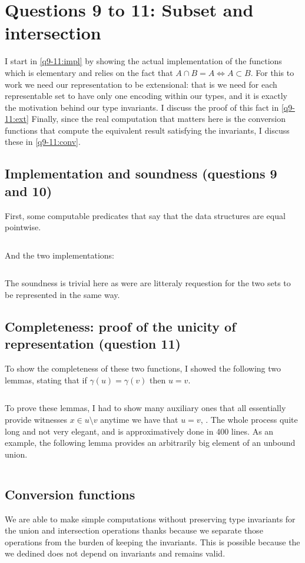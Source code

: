 \section{Questions 9 to 11: Subset and intersection}

I start in \autoref{q9-11:impl} by showing the actual implementation of the functions
which is elementary and relies on the fact that $A\cap B=A \iff A \subset B$.
%
For this to work we need our representation to be extensional: that is we need for
each representable set to have only one encoding within our types, and it is exactly
the motivation behind our type invariants. I discuss the proof of this fact in
\autoref{q9-11:ext}
%
Finally, since the real computation that matters here is the conversion functions
that compute the equivalent result satisfying the invariants, I discuss these in
\autoref{q9-11:conv}.


\subsection{Implementation and soundness (questions 9 and 10)}\label{q9-11:impl}

First, some computable predicates that say that the data structures are equal pointwise.
\inputminted{\whyml}{why3code/weak_eq.mlw}
And the two implementations:
\inputminted{\whyml}{why3code/incl_disj.mlw}

The soundness is trivial here as were are litteraly requestion for the two sets to be
represented in the same way.

\subsection{Completeness: proof of the unicity of representation (question
  11)}\label{q9-11:ext}

To show the completeness of these two functions, I showed the following two lemmas,
stating that if $\gamma(u)=\gamma(v)$ then $u = v$.
%
\inputminted{\whyml}{why3code/extentionality_lemmas.mlw}
%
To prove these lemmas, I had to show many auxiliary ones that all essentially provide
witnesses $x \in u \setminus v$ anytime we have that $u = v$, .
%
The whole process quite long and not very elegant, and is approximatively done in 400
lines. As an example, the following lemma provides an arbitrarily big element of an
unbound union.
%
\inputminted{\whyml}{why3code/ghost_example.mlw}

\subsection{Conversion functions}\label{q9-11:conv}
We are able to make simple computations without preserving type invariants for the
union and intersection operations thanks because we separate those operations from
the burden of keeping the invariants. This is possible because the  we
dedined does not depend on invariants and remains valid.

